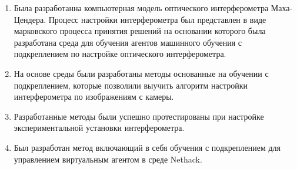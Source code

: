 \begin{enumerate}
  \item Была разработанна компьютерная модель оптического интерферометра Маха-Цендера. Процесс настройки интерферометра был представлен в виде марковского процесса принятия решений на основании которого была разработана среда для обучения агентов машинного обучения с подкреплением по настройке оптического интерферометра. 
  \item На основе среды были разработаны методы основанные на обучении с подкреплением, которые позволили выучить алгоритм настройки интерферометра по изображениям с камеры. 
  \item Разработанные методы были успешно протестированы при настройке экспериментальной установки интерферометра. 
  \item Был разработан метод включающий в себя обучения с подкреплением для управлением виртуальным агентом в среде Nethack. 
\end{enumerate}

\newpage
